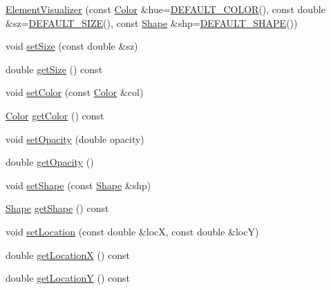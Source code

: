 \begin{DoxyCompactItemize}
\item 
\hyperlink{classbridges_1_1_element_visualizer_addcc19a2f7fd51dcc7aebfdabb882886}{Element\+Visualizer} (const \hyperlink{classbridges_1_1_color}{Color} \&hue=\hyperlink{classbridges_1_1_element_visualizer_af86eb415ef765943472952ba49f7163d}{D\+E\+F\+A\+U\+L\+T\+\_\+\+C\+O\+L\+O\+R}(), const double \&sz=\hyperlink{classbridges_1_1_element_visualizer_a3e21ee8df1c6c3f22a8c631894344413}{D\+E\+F\+A\+U\+L\+T\+\_\+\+S\+I\+Z\+E}(), const \hyperlink{namespacebridges_a1b4050586bd708782ae0d4f3b06b9579}{Shape} \&shp=\hyperlink{classbridges_1_1_element_visualizer_a79c6eef0e43bdd61b9292053dfe45f29}{D\+E\+F\+A\+U\+L\+T\+\_\+\+S\+H\+A\+P\+E}())
\item 
void \hyperlink{classbridges_1_1_element_visualizer_a6fc924e754008992b310a89d8d88fce9}{set\+Size} (const double \&sz)
\item 
double \hyperlink{classbridges_1_1_element_visualizer_aae6ce4807e470d0bda96cf6753e81669}{get\+Size} () const 
\item 
void \hyperlink{classbridges_1_1_element_visualizer_af14723066e52c159eebfb804d65dd825}{set\+Color} (const \hyperlink{classbridges_1_1_color}{Color} \&col)
\item 
\hyperlink{classbridges_1_1_color}{Color} \hyperlink{classbridges_1_1_element_visualizer_a93012c4fb2d8a67128b5c83cc8e5c190}{get\+Color} () const 
\item 
void \hyperlink{classbridges_1_1_element_visualizer_a8f77db4a2774021aec4ab8ea18e50fc9}{set\+Opacity} (double opacity)
\item 
double \hyperlink{classbridges_1_1_element_visualizer_ae806977ebc8ff1c5bce81c90b31902b5}{get\+Opacity} ()
\item 
void \hyperlink{classbridges_1_1_element_visualizer_af81cc20423f2fedffa81fb7c473a1179}{set\+Shape} (const \hyperlink{namespacebridges_a1b4050586bd708782ae0d4f3b06b9579}{Shape} \&shp)
\item 
\hyperlink{namespacebridges_a1b4050586bd708782ae0d4f3b06b9579}{Shape} \hyperlink{classbridges_1_1_element_visualizer_a3e1bb5ba7ae2e5a23fbb75c7b09d350c}{get\+Shape} () const 
\item 
void \hyperlink{classbridges_1_1_element_visualizer_ad06f2fd509f6b3474feeb4fa1fef38d5}{set\+Location} (const double \&loc\+X, const double \&loc\+Y)
\item 
double \hyperlink{classbridges_1_1_element_visualizer_a660dfe007963b4e9314a5da07f776e78}{get\+Location\+X} () const 
\item 
double \hyperlink{classbridges_1_1_element_visualizer_acbd58b69a2b8e44735e4c87783710439}{get\+Location\+Y} () const 
\end{DoxyCompactItemize}
